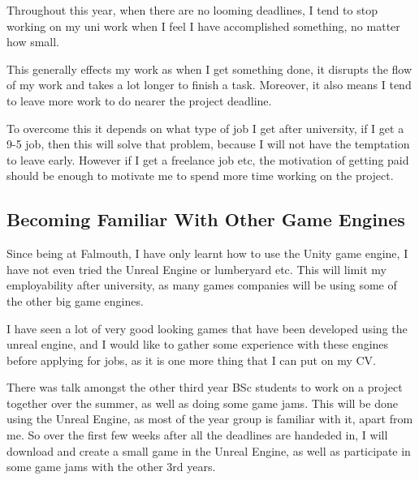 \documentclass{scrartcl}
\begin{document}
Throughout this year, when there are no looming deadlines, I tend to stop working on my uni work when I feel I have accomplished something, no matter how small.

This generally effects my work as when I get something done, it disrupts the flow of my work and takes a lot longer to finish a task. Moreover, it also means I tend to leave more work to do nearer the project deadline.

To overcome this it depends on what type of job I get after university, if I get a 9-5 job, then this will solve that problem, because I will not have the temptation to leave early. However if I get a freelance job etc, the motivation of getting paid should be enough to motivate me to spend more time working on the project.
\par



\subsection{Becoming Familiar With Other Game Engines}
Since being at Falmouth, I have only learnt how to use the Unity game engine, I have not even tried the Unreal Engine or lumberyard etc. This will limit my employability after university, as many games companies will be using some of the other big game engines.

I have seen a lot of very good looking games that have been developed using the unreal engine, and I would like to gather some experience with these engines before applying for jobs, as it is one more thing that I can put on my CV.

There was talk amongst the other third year BSc students to work on a project together over the summer, as well as doing some game jams. This will be done using the Unreal Engine, as most of the year group is familiar with it, apart from me. So over the first few weeks after all the deadlines are handeded in, I will download and create a small game in the Unreal Engine, as well as participate in some game jams with the other 3rd years.
\par
\end{document}
